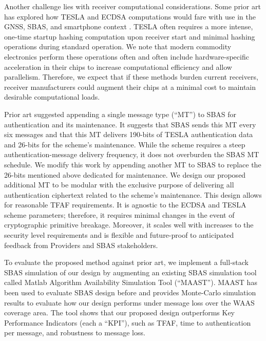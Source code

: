 \documentclass[letterpaper,times]{IONconf/IONconf}
\begin{document}
	Another challenge lies with receiver computational considerations.
	Some prior art has explored how TESLA and ECDSA computations would fare with use in the GNSS, SBAS, and smartphone context \cite{tesla-cpus}.
	TESLA often requires a more intense, one-time startup hashing computation upon receiver start and minimal hashing operations during standard operation.
	We note that modern commodity electronics perform these operations often and often include hardware-specific acceleration in their chips to increase computational efficiency and allow parallelism.
	Therefore, we expect that if these methods burden current receivers, receiver manufacturers could augment their chips at a minimal cost to maintain desirable computational loads.

	Prior art suggested appending a single message type (``MT'') to SBAS for authentication and its maintenance\cite{Neish_Dissertation}.
	It suggests that SBAS sends this MT every six messages and that this MT delivers 190-bits of TESLA authentication data and 26-bits for the scheme's maintenance.
	While the scheme requires a steep authentication-message delivery frequency, it does not overburden the SBAS MT schedule.
	We modify this work by appending another MT to SBAS to replace the 26-bits mentioned above dedicated for maintenance.
	We design our proposed additional MT to be modular with the exclusive purpose of delivering all authentication ciphertext related to the scheme's maintenance.
	This design allows for reasonable TFAF requirements.
	It is agnostic to the ECDSA and TESLA scheme parameters; therefore, it requires minimal changes in the event of cryptographic primitive breakage.
	Moreover, it scales well with increases to the security level requirements and is flexible and future-proof to anticipated feedback from Providers and SBAS stakeholders.

	To evaluate the proposed method against prior art, we implement a full-stack SBAS simulation of our design by augmenting an existing SBAS simulation tool called Matlab Algorithm Availability Simulation Tool (``MAAST'')\cite{MAAST}.
	MAAST has been used to evaluate SBAS design before and provides Monte-Carlo simulation results to evaluate how our design performs under message loss over the WAAS coverage area.
	The tool shows that our proposed design outperforms Key Performance Indicators (each a ``KPI''), such as TFAF, time to authentication per message, and robustness to message loss.
\end{document}
